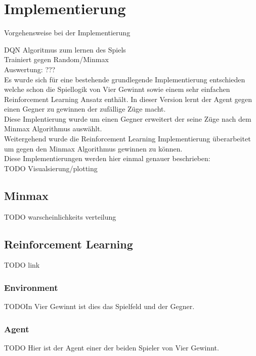 \chapter{Implementierung}%

\label{cha:Implementierung}

Vorgehensweise bei der Implementierung

\colorbox{red!30}{DQN Algoritmus zum lernen des Spiels}\\

\colorbox{red!30}{Trainiert gegen Random/Minmax}\\

\colorbox{red!30}{Auswertung: ???}\\


Es wurde sich für eine bestehende grundlegende Implementierung entschieden welche schon die Spiellogik von Vier Gewinnt sowie einem sehr einfachen Reinforcement Learning Ansatz enthält. In dieser Version lernt der Agent gegen einen Gegner zu gewinnen der zufällige Züge macht.\\
Diese Implentierung wurde um einen Gegner erweitert der seine Züge nach dem Minmax Algorithmus auswählt.\\
Weitergehend wurde die Reinforcement Learning Implementierung überarbeitet um gegen den Minmax Algorithmus gewinnen zu können.\\
Diese Implementierungen werden hier einmal genauer beschrieben:\\
\colorbox{red!30}{TODO Visualsierung/plotting}

\section{Minmax}
\colorbox{red!30}{TODO warscheinlichkeits verteilung}

\section{Reinforcement Learning}
\colorbox{red!30}{TODO link}

\subsection{Environment}
\colorbox{red!30}{TODO}In Vier Gewinnt ist dies das Spielfeld und der Gegner. 

\subsection{Agent}
\colorbox{red!30}{TODO} Hier ist der Agent einer der beiden Spieler von Vier Gewinnt.

